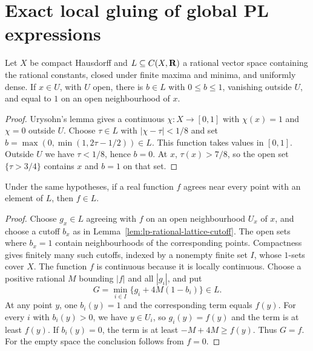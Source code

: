 \section{Exact local gluing of global PL expressions}

\begin{lemma}\label{lem:lp-rational-lattice-cutoff}
\leanok
Let $X$ be compact Hausdorff and $L\subseteq C(X,\mathbf{R})$ a rational vector space containing the
rational constants, closed under finite maxima and minima, and uniformly dense. If $x\in U$,
with $U$ open, there is $b\in L$ with $0\le b\le1$, vanishing outside $U$, and equal to $1$
on an open neighbourhood of $x$.
\end{lemma}
\begin{proof}
Urysohn's lemma gives a continuous $\chi\colon X\to[0,1]$ with $\chi(x)=1$ and $\chi=0$ outside
$U$. Choose $\tau\in L$ with $|\chi-\tau|<1/8$ and set
$b=\max(0,\min(1,2\tau-1/2))\in L$. This function takes values in $[0,1]$.
Outside $U$ we have $\tau<1/8$, hence $b=0$. At $x$, $\tau(x)>7/8$, so the open set
$\{\tau>3/4\}$ contains $x$ and $b=1$ on that set.
\end{proof}

\begin{lemma}\label{lem:lp-rational-lattice-sheaf}
\leanok
{}
Under the same hypotheses, if a real function $f$ agrees near every point with an element of
$L$, then $f\in L$.
\end{lemma}
\begin{proof}
Choose $g_x\in L$ agreeing with $f$ on an open neighbourhood $U_x$ of $x$, and choose a cutoff
$b_x$ as in Lemma~\ref{lem:lp-rational-lattice-cutoff}. The open sets where $b_x=1$ contain
neighbourhoods of the corresponding points. Compactness gives finitely many such cutoffs,
indexed by a nonempty finite set $I$, whose $1$-sets cover $X$. The function $f$ is continuous
because it is locally continuous. Choose a positive rational $M$ bounding $|f|$ and all
$|g_i|$, and put
\[
 G=\min_{i\in I}\{g_i+4M(1-b_i)\}\in L.
\]
At any point $y$, one $b_i(y)=1$ and the corresponding term equals $f(y)$.
For every $i$ with $b_i(y)>0$, we have $y\in U_i$, so $g_i(y)=f(y)$ and the term is at least
$f(y)$. If $b_i(y)=0$, the term is at least $-M+4M\ge f(y)$. Thus $G=f$.
For the empty space the conclusion follows from $f=0$.
\end{proof}

